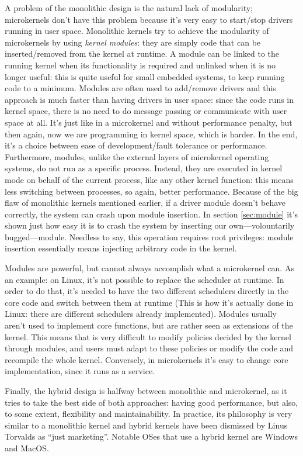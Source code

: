 A problem of the monolithic design is the natural lack of modularity; microkernels don't have this problem because it's very easy to start/stop drivers running in user space. Monolithic kernels try to achieve the modularity of microkernels by using \textit{kernel modules}: they are simply code that can be inserted/removed from the kernel at runtime. A module can be linked to the running kernel when its functionality is required and unlinked when it is no longer useful: this is quite useful for small embedded systems, to keep running code to a minimum. Modules are often used to add/remove drivers and this approach is much faster than having drivers in user space: since the code runs in kernel space, there is no need to do message passing or communicate with user space at all. It's just like in a microkernel and without performance penalty, but then again, now we are programming in kernel space, which is harder. In the end, it's a choice between ease of development/fault tolerance or performance. Furthermore, modules, unlike the external layers of microkernel operating systems, do not run as a specific process. Instead, they are executed in kernel mode on behalf of the current process, like any other kernel function: this means less switching between processes, so again, better performance. Because of the big flaw of monolithic kernels mentioned earlier, if a driver module doesn't behave correctly, the system can crash upon module insertion. In section \ref{sec:module} it's shown just how easy it is to crash the system by inserting our own---volountarily bugged---module. Needless to say, this operation requires root privileges: module insertion essentially means injecting arbitrary code in the kernel.

Modules are powerful, but cannot always accomplish what a microkernel can. As an example: on Linux, it's not possible to replace the scheduler at runtime. In order to do that, it's needed to have the two different schedulers directly in the core code and switch between them at runtime (This is how it's actually done in Linux: there are different schedulers already implemented). Modules usually aren't used to implement core functions, but are rather seen as extensions of the kernel. This means that is very difficult to modify policies decided by the kernel through modules, and users must adapt to these policies or modify the code and recompile the whole kernel. Conversely, in microkernels it's easy to change core implementation, since it runs as a service.

Finally, the hybrid design is halfway between monolithic and microkernel, as it tries to take the best side of both approaches: having good performance, but also, to some extent, flexibility and maintainability. In practice, its philosophy is very similar to a monolithic kernel and hybrid kernels have been dismissed by Linus Torvalds as ``just marketing''\cite{torvalds}. Notable OSes that use a hybrid kernel are Windows and MacOS.

